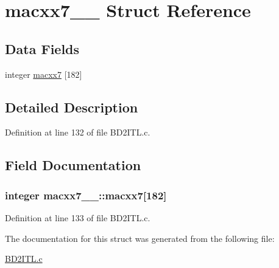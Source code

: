 \hypertarget{structmacxx7__1__}{}\section{macxx7\+\_\+\_\+ Struct Reference}
\label{structmacxx7__1__}
\subsection*{Data Fields}
\begin{DoxyCompactItemize}
\item 
integer \hyperlink{structmacxx7__1___a280e2f91b0402571070d5e2151f412bf}{macxx7} \mbox{[}182\mbox{]}
\end{DoxyCompactItemize}


\subsection{Detailed Description}


Definition at line 132 of file B\+D2\+I\+T\+L.\+c.



\subsection{Field Documentation}
\subsubsection[{\texorpdfstring{macxx7}{macxx7}}]{\setlength{\rightskip}{0pt plus 5cm}integer macxx7\+\_\+\_\+\+::macxx7\mbox{[}182\mbox{]}}\hypertarget{structmacxx7__1___a280e2f91b0402571070d5e2151f412bf}{}\label{structmacxx7__1___a280e2f91b0402571070d5e2151f412bf}


Definition at line 133 of file B\+D2\+I\+T\+L.\+c.



The documentation for this struct was generated from the following file\+:\begin{DoxyCompactItemize}
\item 
\hyperlink{BD2ITL_8c}{B\+D2\+I\+T\+L.\+c}\end{DoxyCompactItemize}
